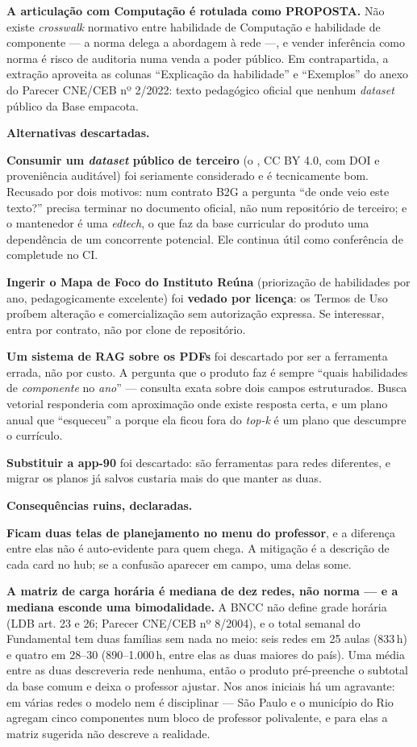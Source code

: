 \textbf{A articulação com Computação é rotulada como PROPOSTA.} Não existe
\emph{crosswalk} normativo entre habilidade de Computação e habilidade de
componente --- a norma delega a abordagem à rede ---, e vender inferência como
norma é risco de auditoria numa venda a poder público. Em contrapartida, a
extração aproveita as colunas \enquote{Explicação da habilidade} e
\enquote{Exemplos} do anexo do Parecer CNE/CEB nº 2/2022: texto pedagógico
oficial que nenhum \emph{dataset} público da Base empacota.

\textbf{Alternativas descartadas.}

\textbf{Consumir um \emph{dataset} público de terceiro} (o ,
CC BY 4.0, com DOI e proveniência auditável) foi seriamente considerado e é
tecnicamente bom. Recusado por dois motivos: num contrato B2G a pergunta
\enquote{de onde veio este texto?} precisa terminar no documento oficial, não
num repositório de terceiro; e o mantenedor é uma \emph{edtech}, o que faz da
base curricular do produto uma dependência de um concorrente potencial. Ele
continua útil como conferência de completude no CI.

\textbf{Ingerir o Mapa de Foco do Instituto Reúna} (priorização de habilidades
por ano, pedagogicamente excelente) foi \textbf{vedado por licença}: os Termos
de Uso proíbem alteração e comercialização sem autorização expressa. Se
interessar, entra por contrato, não por clone de repositório.

\textbf{Um sistema de RAG sobre os PDFs} foi descartado por ser a ferramenta
errada, não por custo. A pergunta que o produto faz é sempre \enquote{quais
habilidades de \emph{componente} no \emph{ano}} --- consulta exata sobre dois
campos estruturados. Busca vetorial responderia com aproximação onde existe
resposta certa, e um plano anual que \enquote{esqueceu} a  porque
ela ficou fora do \emph{top-k} é um plano que descumpre o currículo.

\textbf{Substituir a app-90} foi descartado: são ferramentas para redes
diferentes, e migrar os planos já salvos custaria mais do que manter as duas.

\textbf{Consequências ruins, declaradas.}

\textbf{Ficam duas telas de planejamento no menu do professor}, e a diferença
entre elas não é auto-evidente para quem chega. A mitigação é a descrição de
cada card no hub; se a confusão aparecer em campo, uma delas some.

\textbf{A matriz de carga horária é mediana de dez redes, não norma --- e a
mediana esconde uma bimodalidade.} A BNCC não define grade horária (LDB art. 23
e 26; Parecer CNE/CEB nº 8/2004), e o total semanal do Fundamental tem duas
famílias sem nada no meio: seis redes em 25 aulas (833\,h) e quatro em 28--30
(890--1.000\,h, entre elas as duas maiores do país). Uma média entre as duas
descreveria rede nenhuma, então o produto pré-preenche o subtotal da base comum
e deixa o professor ajustar. Nos anos iniciais há um agravante: em várias redes o
modelo nem é disciplinar --- São Paulo e o município do Rio agregam cinco
componentes num bloco de professor polivalente, e para elas a matriz sugerida
não descreve a realidade.

